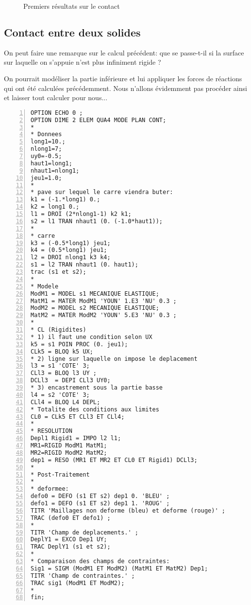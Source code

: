 \begin{figure}[ht]
   \hfill
  \caption{\label{Fig-Cont1} Premiers résultats sur le contact}
\end{figure}






\medskip
\subsection{Contact entre deux solides}

On peut faire une remarque sur le calcul précédent: que se passe-t-il si la surface sur laquelle on s'appuie n'est plus infiniment rigide ?

\medskip
On pourrait modéliser la partie inférieure et lui appliquer les forces de réactions qui ont été calculées précédemment.
Nous n'allons évidemment pas procéder ainsi et laisser \castem tout calculer pour nous...

\color{gris}\scriptsize
\begin{multicols}{2}
\begin{Verbatim}[numbers=left,numbersep=3pt]
OPTION ECHO 0 ;
OPTION DIME 2 ELEM QUA4 MODE PLAN CONT;
*
* Donnees
long1=10.;
nlong1=7;
uy0=-0.5;
haut1=long1;
nhaut1=nlong1;
jeu1=1.0;
*
* pave sur lequel le carre viendra buter:
k1 = (-1.*long1) 0.;
k2 = long1 0.;
l1 = DROI (2*nlong1-1) k2 k1;
s2 = l1 TRAN nhaut1 (0. (-1.0*haut1));
*
* carre
k3 = (-0.5*long1) jeu1;
k4 = (0.5*long1) jeu1;
l2 = DROI nlong1 k3 k4;
s1 = l2 TRAN nhaut1 (0. haut1);
trac (s1 et s2);
*
* Modele
ModM1 = MODEL s1 MECANIQUE ELASTIQUE;
MatM1 = MATER ModM1 'YOUN' 1.E3 'NU' 0.3 ;
ModM2 = MODEL s2 MECANIQUE ELASTIQUE;
MatM2 = MATER ModM2 'YOUN' 5.E3 'NU' 0.3 ;
*
* CL (Rigidites)
* 1) il faut une condition selon UX
k5 = s1 POIN PROC (0. jeu1);
CLk5 = BLOQ k5 UX;
* 2) ligne sur laquelle on impose le deplacement
l3 = s1 'COTE' 3;
CLl3 = BLOQ l3 UY ;
DCLl3  = DEPI CLl3 UY0;
* 3) encastrement sous la partie basse
l4 = s2 'COTE' 3;
CLl4 = BLOQ L4 DEPL;
* Totalite des conditions aux limites
CL0 = CLk5 ET CLl3 ET CLl4;
*
* RESOLUTION
Depl1 Rigid1 = IMPO l2 l1;
MR1=RIGID ModM1 MatM1;
MR2=RIGID ModM2 MatM2;
dep1 = RESO (MR1 ET MR2 ET CL0 ET Rigid1) DCLl3;
*
* Post-Traitement
*
* deformee:
defo0 = DEFO (s1 ET s2) dep1 0. 'BLEU' ;
defo1 = DEFO (s1 ET s2) dep1 1. 'ROUG' ;
TITR 'Maillages non deforme (bleu) et deforme (rouge)' ;
TRAC (defo0 ET defo1) ;
*
TITR 'Champ de deplacements.' ;
DeplY1 = EXCO Dep1 UY;
TRAC DeplY1 (s1 et s2);
*
* Comparaison des champs de contraintes:
Sig1 = SIGM (ModM1 ET ModM2) (MatM1 ET MatM2) Dep1;
TITR 'Champ de contraintes.' ;
TRAC sig1 (ModM1 ET ModM2);
*
fin;
\end{Verbatim}
\end{multicols}
\color{black}\normalsize

